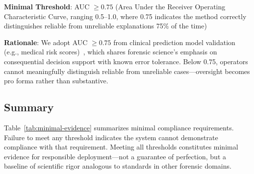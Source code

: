 \textbf{Minimal Threshold}: AUC $\geq 0.75$ (Area Under the Receiver Operating Characteristic Curve, ranging 0.5--1.0, where 0.75 indicates the method correctly distinguishes reliable from unreliable explanations 75\% of the time)

\textbf{Rationale}: We adopt AUC $\geq 0.75$ from clinical prediction model validation (e.g., medical risk scores)~\cite{cohen1988statistical}, which shares forensic science's emphasis on consequential decision support with known error tolerance. Below 0.75, operators cannot meaningfully distinguish reliable from unreliable cases—oversight becomes pro forma rather than substantive.

\subsection{Summary}

Table~\ref{tab:minimal-evidence} summarizes minimal compliance requirements. Failure to meet any threshold indicates the system cannot demonstrate compliance with that requirement. Meeting all thresholds constitutes minimal evidence for responsible deployment—not a guarantee of perfection, but a baseline of scientific rigor analogous to standards in other forensic domains.
